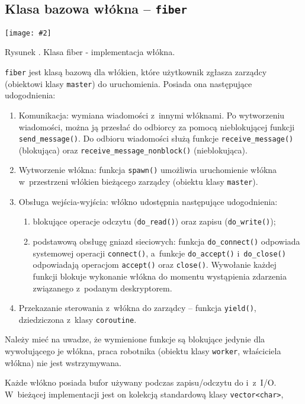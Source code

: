 \documentclass[12pt]{mwart}
\newcommand{\code}{\texttt}
\newcommand{\procbr}{()}
\newcommand{\function}[1]{\code{#1\procbr}}
\newcounter{figmain}
\newcommand{\myownfigure}[4]{ \newcounter{#1} \setcounter{#1}{\value{figmain}} \addtocounter{figmain}{1} \begin{center} \label{fig:#1} \centering \texttt{[image: \#2]}\\ \nopagebreak[5] \parbox[t]{11.5cm}{Rysunek \arabic{#1}. #3.} \end{center}}
\begin{document}
\subsection{Klasa bazowa włókna -- \code{fiber}}
\label{sec:fibersClass}
    \myownfigure{Fiber}{Fiber.png}{Klasa fiber - implementacja włókna}{.7}
%
\indent
  \code{fiber} jest klasą bazową dla włókien, które użytkownik zgłasza zarządcy (obiektowi klasy \code{master}) do uruchomienia.
  Posiada ona następujące udogodnienia:
  \begin{enumerate}
    \item Komunikacja: wymiana wiadomości z~innymi włóknami. Po wytworzeniu wiadomości, można ją przesłać do odbiorcy za pomocą nieblokującej funkcji \function{send\_message}.
    Do odbioru wiadomości służą funkcje \linebreak \function{receive\_message} (blokująca) oraz \function{receive\_message\_nonblock} (nieblokująca).
    \item Wytworzenie włókna: funkcja \function{spawn} umożliwia uruchomienie włókna w~przestrzeni włókien bieżącego zarządcy (obiektu klasy \code{master}).
    \item Obsługa wejścia-wyjścia: włókno udostępnia następujące udogodnienia:
      \begin{enumerate}
        \item blokujące operacje odczytu (\function{do\_read}) oraz zapisu (\function{do\_write});
        \item podstawową obsługę gniazd sieciowych: funkcja \function{do\_connect} odpowiada systemowej operacji \function{connect}, a~funkcje \function{do\_accept} 
          \linebreak i~\function{do\_close} odpowiadają operacjom \function{accept} oraz \function{close}. Wywołanie każdej funkcji blokuje wykonanie włókna do momentu wystąpienia  
          zdarzenia związanego z~podanym deskryptorem.
      \end{enumerate}
    \item Przekazanie sterowania z~włókna do zarządcy -- funkcja \function{yield}, dziedziczona z~klasy \code{coroutine}.
  \end{enumerate}
  Należy mieć na uwadze, że wymienione funkcje są blokujące jedynie dla wywołującego je włókna, praca robotnika (obiektu klasy \code{worker}, właściciela włókna) nie jest wstrzymywana.
\par
\indent
  Każde włókno posiada bufor używany podczas zapisu/odczytu do i~z~I/O. W~bieżącej implementacji jest on kolekcją standardową klasy \code{vector<char>},
\end{document}
